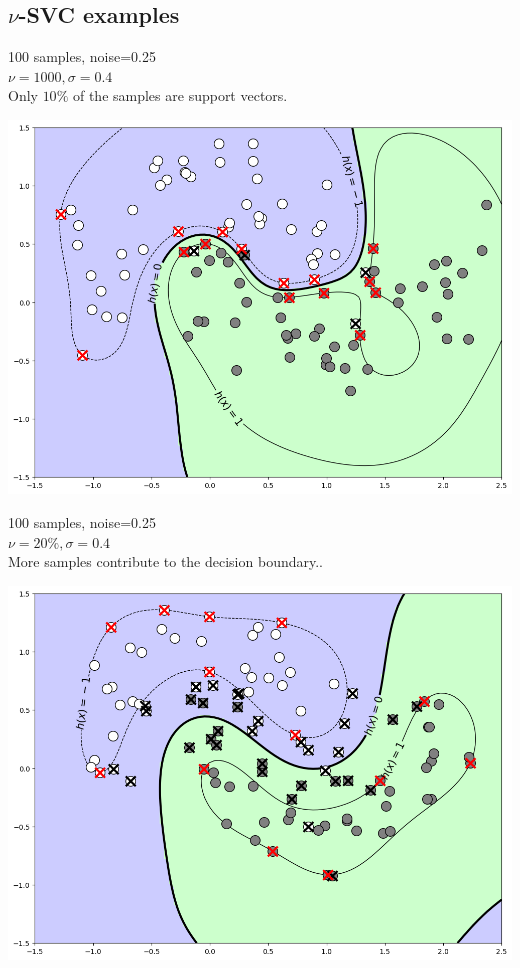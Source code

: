 \documentclass{article}
\begin{document}
\begin{multicols*}{3}
\section*{$\nu$-SVC examples}
\begin{minipage}{0.5\columnwidth}
	100 samples, noise=0.25\\
	$\nu=1000 ,\sigma=0.4$\\
	Only $10\%$ of the samples are support vectors.\columnbreak  
\end{minipage}
\begin{minipage}{0.4\columnwidth}
\includegraphics[width=\columnwidth]{nusvc001.png}
\end{minipage}

\begin{minipage}{0.5\columnwidth}
	100 samples, noise=0.25\\
	$\nu=20\% ,\sigma=0.4$\\
	More samples contribute to the decision boundary..\columnbreak  
\end{minipage}
\begin{minipage}{0.4\columnwidth}
\includegraphics[width=\columnwidth]{nusvc002.png}
\end{minipage}


\end{multicols*}
\end{document}
